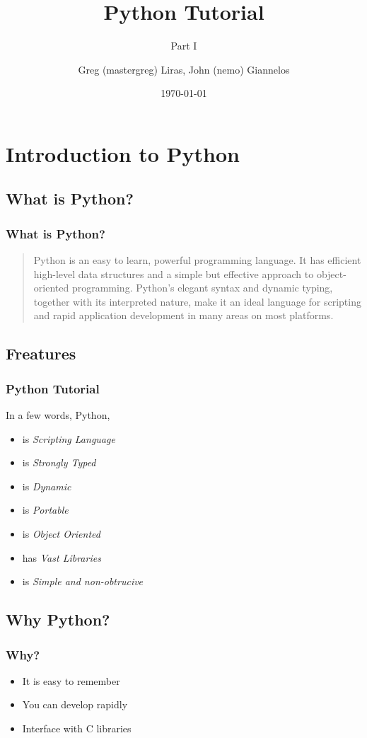 \documentclass{beamer}
\author[nemo/mastergreg]{Greg (mastergreg) Liras, John (nemo) Giannelos}
\institute{FOSS NTUA}
\title{Python Tutorial}
\subtitle{Part I}
\date{\today}
\begin{document}
\begin{frame}
	\titlepage
\end{frame}


\section{Introduction to Python}

\subsection{What is Python?}
\begin{frame}
	\frametitle{What is Python?}
\begin{quote}
Python is an easy to learn, powerful programming language. It has efficient
high-level data structures and a simple but effective approach to
object-oriented programming. Python’s elegant syntax and dynamic typing,
together with its interpreted nature, make it an ideal language for scripting
and rapid application development in many areas on most platforms.
\end{quote}
\end{frame}

\subsection{Freatures}
\begin{frame}
	\frametitle{Python Tutorial}

In a few words, Python,
\begin{itemize}
\item<1-> is \emph{Scripting Language}
\item<2-> is \emph{Strongly Typed}
\item<3-> is \emph{Dynamic}
\item<4-> is \emph{Portable}
\item<5-> is \emph{Object Oriented}
\item<6-> has \emph{Vast Libraries}
\item<7-> is \emph{Simple and non-obtrucive}
\end{itemize}

\end{frame}

\subsection{Why Python?}
\begin{frame}
	\frametitle{Why?}
	\begin{itemize}
	\item<1-> It is easy to remember
	\item<2-> You can develop rapidly
	\item<3-> Interface with C libraries
	\end{itemize}
\end{frame}
\end{document}

